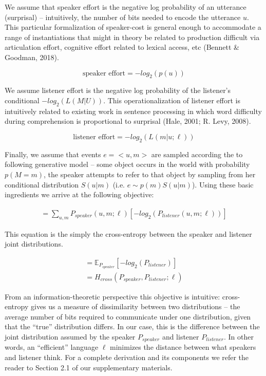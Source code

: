 \documentclass[10pt, letterpaper]{article}
\begin{document}
We assume that speaker effort is the negative log probability of an
utterance (surprisal) -- intuitively, the number of bits needed to
encode the utterance \(u\). This particular formalization of
speaker-cost is general enough to accommodate a range of instantiations
that might in theory be related to production difficult via articulation
effort, cognitive effort related to lexical access, etc (Bennett \&
Goodman, 2018).\par

\[\text{speaker effort} = -log_2(p(u))\]

We assume listener effort is the negative log probability of the
listener's conditional \(-log_2(L(M|U))\). This operationalization of
listener effort is intuitively related to existing work in sentence
processing in which word difficulty during comprehension is proportional
to surprisal (Hale, 2001; R. Levy, 2008).

\[\text{listener effort} = -log_2(L(m|u; \ell))\]

Finally, we assume that events \(e = <u, m>\) are sampled according the
to following generative model -- some object occurs in the world with
probability \(p(M=m)\), the speaker attempts to refer to that object by
sampling from her conditional distribution \(S(u|m)\) (i.e.
\(e \sim p(m)S(u|m)\)). Using these basic ingredients we arrive at the
following objective:

\begin{equation}
\begin{split}
  = \sum_{u, m}P_{speaker}(u, m; \ell)[-log_2(P_{listener}(u, m; \ell))]
\end{split}
\end{equation}

This equation is the simply the cross-entropy between the speaker and
listener joint distributions.

\begin{equation}
\begin{split}
  = \mathbb{E}_{P_{speaker}}[-log_2(P_{listener})] \\
  = H_{cross}(P_{speaker}, P_{listener}; \ell)
\end{split}
\end{equation}

From an information-theoretic perspective this objective is intuitive:
cross-entropy gives us a measure of dissimilarity between two
distributions -- the average number of bits required to communicate
under one distribution, given that the ``true'' distribution differs. In
our case, this is the difference between the joint distribution assumed
by the speaker \(P_{speaker}\) and listener \(P_{listener}\). In other
words, an ``efficient'' language \(\ell\) minimizes the distance between
what speakers and listener think. For a complete derivation and its
components we refer the reader to Section 2.1 of our supplementary
materials.\par
\end{document}
